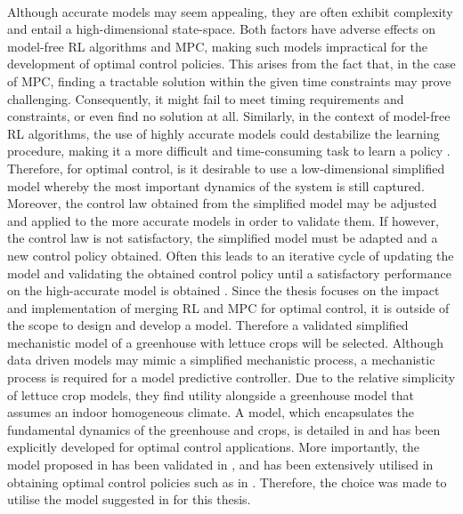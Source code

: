 \\
Although accurate models may seem appealing, they are often exhibit complexity and entail a high-dimensional state-space. Both factors have adverse effects on model-free RL algorithms and MPC, making such models impractical for the development of optimal control policies. This arises from the fact that, in the case of MPC, finding a tractable solution within the given time constraints may prove challenging. Consequently, it might fail to meet timing requirements and constraints, or even find no solution at all. Similarly, in the context of model-free RL algorithms, the use of highly accurate models could destabilize the learning procedure, making it a more difficult and time-consuming task to learn a policy \cite{lawrynczukMPCAlgorithms2014,dulac-arnoldChallengesRealWorldReinforcement2019}. Therefore, for optimal control, is it desirable to use a low-dimensional simplified model whereby the most important dynamics of the system is still captured. Moreover, the control law obtained from the simplified model may be adjusted and applied to the more accurate models in order to validate them. If however, the control law is not satisfactory, the simplified model must be adapted and a new control policy obtained. Often this leads to an iterative cycle of updating the model and validating the obtained control policy until a satisfactory performance on the high-accurate model is obtained \cite{knibbeDigitalTwinsGreen2022}. Since the thesis focuses on the impact and implementation of merging RL and MPC for optimal control, it is outside of the scope to design and develop a model.
Therefore a validated simplified mechanistic model of a greenhouse with lettuce crops will be selected. Although data driven models may mimic a simplified mechanistic process, a mechanistic process is required for a model predictive controller. 
Due to the relative simplicity of lettuce crop models, they find utility alongside a greenhouse model that assumes an indoor homogeneous climate. A model, which encapsulates the fundamental dynamics of the greenhouse and crops, is detailed in \cite{hentenGreenhouseClimateManagement1994} and has been explicitly developed for optimal control applications. More importantly, the model proposed in \cite{hentenGreenhouseClimateManagement1994} has been validated in \cite{vanhentenValidationDynamicLettuce1994}, and has been extensively utilised in obtaining optimal control policies such as in \cite{jansenOptimalControlLettuce2023,vanstratenOptimalGreenhouseCultivation2010,ghoumariNonlinearConstrainedMPC2005,lubbersAutonomousGreenhouseClimate2023, morcegoReinforcementLearningModel2023}. Therefore, the choice was made to utilise the model suggested in \cite{hentenGreenhouseClimateManagement1994} for this thesis.



